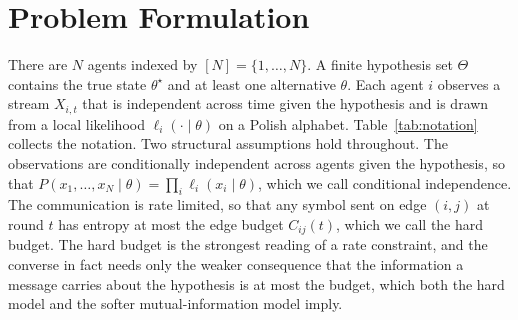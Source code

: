 \documentclass[journal]{IEEEtran}
\theoremstyle{definition}
\theoremstyle{remark}
\begin{document}
\section{Problem Formulation}\label{sec:model}
There are $N$ agents indexed by $[N]=\{1,\dots,N\}$. A finite hypothesis set $\Theta$ contains the true state
$\theta^\star$ and at least one alternative $\theta$. Each agent $i$ observes a stream $X_{i,t}$ that is
independent across time given the hypothesis and is drawn from a local likelihood $\ell_i(\cdot\mid\theta)$ on a
Polish alphabet. Table~\ref{tab:notation} collects the notation. Two structural assumptions hold throughout. The
observations are conditionally independent across agents given the hypothesis, so that
$P(x_1,\dots,x_N\mid\theta)=\prod_i \ell_i(x_i\mid\theta)$, which we call conditional independence. The
communication is rate limited, so that any symbol sent on edge $(i,j)$ at round $t$ has entropy at most the edge
budget $C_{ij}(t)$, which we call the hard budget. The hard budget is the strongest reading of a rate constraint,
and the converse in fact needs only the weaker consequence that the information a message carries about the
hypothesis is at most the budget, which both the hard model and the softer mutual-information model imply.
\end{document}
